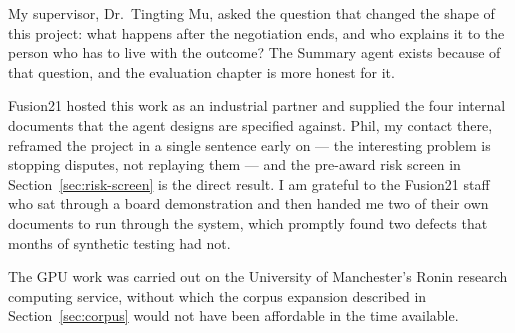 My supervisor, Dr.\ Tingting Mu, asked the question that changed the shape of this
project: what happens after the negotiation ends, and who explains it to the person
who has to live with the outcome? The Summary agent exists because of that
question, and the evaluation chapter is more honest for it.

Fusion21 hosted this work as an industrial partner and supplied the four internal
documents that the agent designs are specified against. Phil, my contact there,
reframed the project in a single sentence early on --- the interesting problem is
stopping disputes, not replaying them --- and the pre-award risk screen in
Section~\ref{sec:risk-screen} is the direct result. I am grateful to the Fusion21
staff who sat through a board demonstration and then handed me two of their own
documents to run through the system, which promptly found two defects that months
of synthetic testing had not.

The GPU work was carried out on the University of Manchester's Ronin research
computing service, without which the corpus expansion described in
Section~\ref{sec:corpus} would not have been affordable in the time available.
